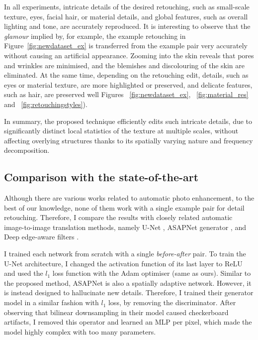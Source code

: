 In all experiments, intricate details of the desired retouching, such as small-scale texture, eyes, facial hair, or material details, and global features, such as overall lighting and tone, are accurately reproduced. It is interesting to observe that the \emph{glamour} implied by, for example, the example retouching in Figure~\ref{fig:newdataset_ex} is transferred from the example pair very accurately without causing an artificial appearance. Zooming into the skin reveals that pores and wrinkles are minimised, and the blemishes and discolouring of the skin are eliminated. At the same time, depending on the retouching edit, details, such as eyes or material texture, are more highlighted or preserved, and delicate features, such as hair, are preserved well Figures ~\ref{fig:newdataset_ex}, ~\ref{fig:material_res} and ~\ref{fig:retouchingstyles}).

In summary, the proposed technique efficiently edits such intricate details, due to significantly distinct local statistics of the texture at multiple scales, without affecting overlying structures thanks to its spatially varying nature and frequency decomposition.

\subsection{Comparison with the state-of-the-art}
\label{sec:Comparisons}


Although there are various works related to automatic photo enhancement, to the best of our knowledge, none of them work with a single example pair for detail retouching. Therefore, I compare the results with closely related automatic image-to-image translation methods, namely U-Net \cite{ronneberger2015u}, ASAPNet generator \cite{shaham2021spatially}, and Deep edge-aware filters \cite{xu2015deep}.

I trained each network from scratch with a single \textit{before-after} pair. To train the U-Net architecture, I changed the activation function of its last layer to ReLU and used the $l_1$ loss function with the Adam optimiser (same as ours). Similar to the proposed method, ASAPNet is also a spatially adaptive network. However, it is instead designed to hallucinate new details. Therefore, I trained their generator model in a similar fashion with $l_1$ loss, by removing the discriminator. After observing that bilinear downsampling in their model caused checkerboard artifacts, I removed this operator and learned an MLP per pixel, which made the model highly complex with too many parameters.


